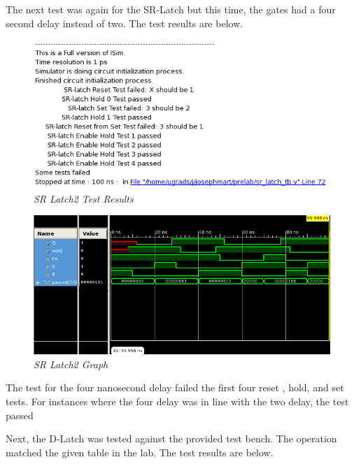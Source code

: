 \documentclass[a4paper,12pt]{article}
\begin{document}
  The next test was again for the SR-Latch but this time, the gates had a four
  second delay instead of two. The test results are below.
  
  \begin{figure}[h]
    \begin{center}
      \includegraphics[scale=0.53]{sr_latch2_tests.png}
      \caption{\textit{SR Latch2 Test Results}}
    \end{center}
  \end{figure}
  
  \newpage
  
  \begin{figure}[h]
    \begin{center}
      \includegraphics[scale=0.4]{sr_latch2_graph.png}
      \caption{\textit{SR Latch2 Graph}}
    \end{center}
  \end{figure}
  
  The test for the four nanosecond delay failed the first four reset
  , hold, and set tests. For instances where the four delay was in line
  with the two delay, the test passed
  
  Next, the D-Latch was tested against the provided test bench. The operation
  matched the given table in the lab. The test results are below.
  
\end{document}
